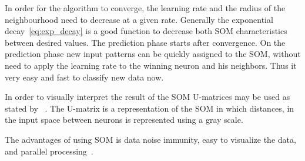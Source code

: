 In order for the algorithm to converge, the learning rate and the radius of the neighbourhood need to decrease at a given rate. Generally the exponential decay~\ref{eq:exp_decay} is a good function to decrease both \ac{SOM} characteristics between desired values.
The prediction phase starts after convergence. On the prediction phase new input patterns can be quickly assigned to the SOM, without need to apply the learning rate to the winning neuron and his neighbors. Thus it very easy and fast to classify new data now.



In order to visually interpret the result of the SOM U-matrices may be used as stated by ~\citep{Bacao2005}. The U-matrix is a representation of the SOM in which distances, in the input space between neurons is represented using a gray scale.

The advantages of using SOM is data noise immunity, easy to visualize the data, and parallel processing~\cite{Liu2012b}.
 
